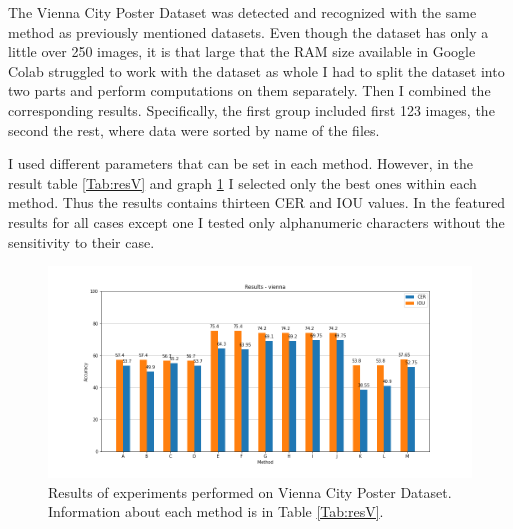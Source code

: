 The Vienna City Poster Dataset was detected and recognized with the same method as previously mentioned datasets. Even though the dataset has only a little over 250 images, it is that large that the RAM size available in Google Colab struggled to work with the dataset as whole I had to split the dataset into two parts and perform computations on them separately. Then I combined the corresponding results. Specifically, the first group included first 123 images, the second the rest, where data were sorted by name of the files.

I used different parameters that can be set in each method. However, in the result table \ref*{Tab:resV} and graph \ref*{Im:resV} I selected only the best ones within each method. Thus the results contains     thirteen CER and IOU values. In the featured results for all cases except one I tested only alphanumeric characters without the sensitivity to their case.


\begin{figure}[hbt!]
    \centering
    \includegraphics[scale=0.46]{obrazky/grafy/resvienna.png}
    \caption{Results of experiments performed on Vienna City Poster Dataset. Information about each method is in Table \ref*{Tab:resV}.}
    \label{Im:resV}
\end{figure}

